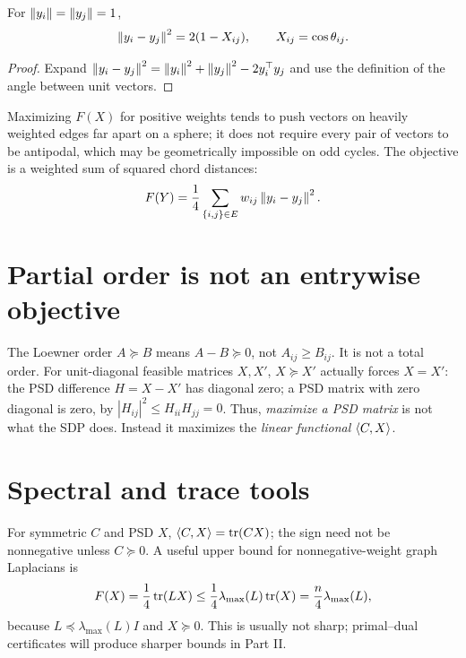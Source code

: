 \begin{lemma}\label{lem:gram-distance}
For $\left\lVert y_i\right\rVert=\left\lVert y_j\right\rVert=1$,
\[
\left\lVert y_i-y_j\right\rVert^2=2(1-X_{ij}),\qquad X_{ij}=\cos\theta_{ij}.
\]
\end{lemma}
\begin{proof}
Expand $\left\lVert y_i-y_j\right\rVert^2=\left\lVert y_i\right\rVert^2+\left\lVert y_j\right\rVert^2-2y_i^\top y_j$ and use the definition of the angle between unit vectors.
\end{proof}
\begin{intuition}
Maximizing $F(X)$ for positive weights tends to push vectors on heavily weighted edges far apart on a sphere; it does not require every pair of vectors to be antipodal, which may be geometrically impossible on odd cycles. The objective is a weighted sum of squared chord distances:
\[
F(Y)=\frac14\sum_{\{i,j\}\in E}w_{ij}\left\lVert y_i-y_j\right\rVert^2.
\]
\end{intuition}

\section{Partial order is not an entrywise objective}
The Loewner order $A\succeq B$ means $A-B\succeq0$, not $A_{ij}\ge B_{ij}$. It is not a total order. For unit-diagonal feasible matrices $X,X'$, $X\succeq X'$ actually forces $X=X'$: the PSD difference $H=X-X'$ has diagonal zero; a PSD matrix with zero diagonal is zero, by $|H_{ij}|^2\le H_{ii}H_{jj}=0$. Thus, \emph{maximize a PSD matrix} is not what the SDP does. Instead it maximizes the \emph{linear functional} $\left\langle C,X\right\rangle$.

\section{Spectral and trace tools}
For symmetric $C$ and PSD $X$, $\left\langle C,X\right\rangle=\operatorname{tr}(CX)$; the sign need not be nonnegative unless $C\succeq0$. A useful upper bound for nonnegative-weight graph Laplacians is
\begin{equation}\label{eq:spectral-bound}
F(X)=\frac14\operatorname{tr}(LX)\le \frac14\lambda_{\max}(L)\operatorname{tr}(X)=\frac n4\lambda_{\max}(L),
\end{equation}
because $L\preceq\lambda_{\max}(L)I$ and $X\succeq0$. This is usually not sharp; primal--dual certificates will produce sharper bounds in Part II.
